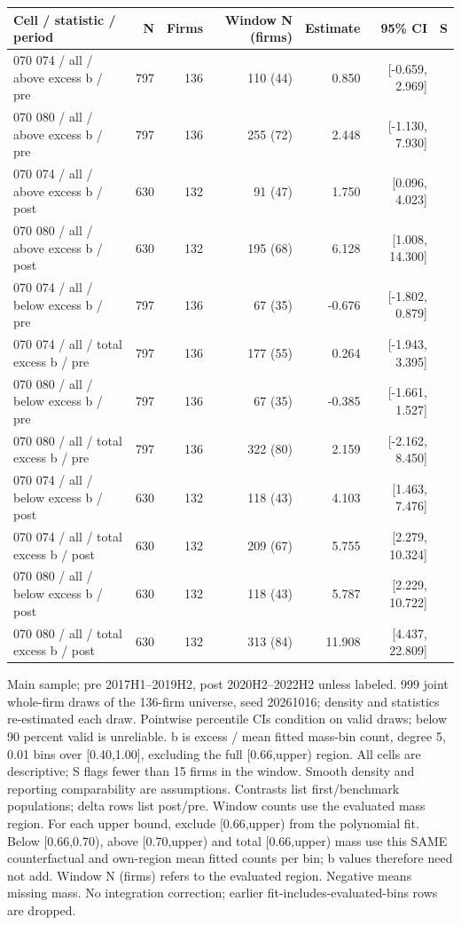 \begingroup\scriptsize\setlength{\tabcolsep}{3pt}
\begin{threeparttable}
\begin{tabular}{p{5.7cm}rrrrrl}
\toprule
Cell / statistic / period & N & Firms & Window N (firms) & Estimate & 95\% CI & S \\
\midrule
070 074 / all / above excess b / pre & 797 & 136 & 110 (44) & 0.850 & [-0.659, 2.969] &  \\
070 080 / all / above excess b / pre & 797 & 136 & 255 (72) & 2.448 & [-1.130, 7.930] &  \\
070 074 / all / above excess b / post & 630 & 132 & 91 (47) & 1.750 & [0.096, 4.023] &  \\
070 080 / all / above excess b / post & 630 & 132 & 195 (68) & 6.128 & [1.008, 14.300] &  \\
070 074 / all / below excess b / pre & 797 & 136 & 67 (35) & -0.676 & [-1.802, 0.879] &  \\
070 074 / all / total excess b / pre & 797 & 136 & 177 (55) & 0.264 & [-1.943, 3.395] &  \\
070 080 / all / below excess b / pre & 797 & 136 & 67 (35) & -0.385 & [-1.661, 1.527] &  \\
070 080 / all / total excess b / pre & 797 & 136 & 322 (80) & 2.159 & [-2.162, 8.450] &  \\
070 074 / all / below excess b / post & 630 & 132 & 118 (43) & 4.103 & [1.463, 7.476] &  \\
070 074 / all / total excess b / post & 630 & 132 & 209 (67) & 5.755 & [2.279, 10.324] &  \\
070 080 / all / below excess b / post & 630 & 132 & 118 (43) & 5.787 & [2.229, 10.722] &  \\
070 080 / all / total excess b / post & 630 & 132 & 313 (84) & 11.908 & [4.437, 22.809] &  \\
\bottomrule
\end{tabular}
\begin{tablenotes}[flushleft]\footnotesize
\item[] Main sample; pre 2017H1--2019H2, post 2020H2--2022H2 unless labeled. 999 joint whole-firm draws of the 136-firm universe, seed 20261016; density and statistics re-estimated each draw. Pointwise percentile CIs condition on valid draws; below 90 percent valid is unreliable. b is excess / mean fitted mass-bin count, degree 5, 0.01 bins over [0.40,1.00], excluding the full [0.66,upper) region. All cells are descriptive; S flags fewer than 15 firms in the window. Smooth density and reporting comparability are assumptions. Contrasts list first/benchmark populations; delta rows list post/pre. Window counts use the evaluated mass region. For each upper bound, exclude [0.66,upper) from the polynomial fit. Below [0.66,0.70), above [0.70,upper) and total [0.66,upper) mass use this SAME counterfactual and own-region mean fitted counts per bin; b values therefore need not add. Window N (firms) refers to the evaluated region. Negative means missing mass. No integration correction; earlier fit-includes-evaluated-bins rows are dropped.
\end{tablenotes}
\end{threeparttable}
\endgroup
\par\medskip
